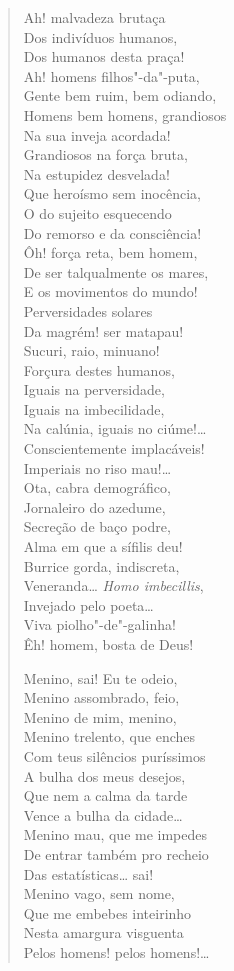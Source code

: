 \begin{verse}
Ah! malvadeza brutaça\\
Dos indivíduos humanos,\\
Dos humanos desta praça!\\
Ah! homens filhos"-da"-puta,\\
Gente bem ruim, bem odiando,\\
Homens bem homens, grandiosos\\
Na sua inveja acordada!\\
Grandiosos na força bruta,\\
Na estupidez desvelada!\\
Que heroísmo sem inocência,\\
O do sujeito esquecendo\\
Do remorso e da consciência!\\
Ôh! força reta, bem homem,\\
De ser talqualmente os mares,\\
E os movimentos do mundo!\\
Perversidades solares\\
Da magrém! ser matapau!\\
Sucuri, raio, minuano!\\
Forçura destes humanos,\\
Iguais na perversidade,\\
Iguais na imbecilidade,\\
Na calúnia, iguais no ciúme!\ldots{}\\
Conscientemente implacáveis!\\
Imperiais no riso mau!\ldots{}\\
Ota, cabra demográfico,\\
Jornaleiro do azedume,\\
Secreção de baço podre,\\
Alma em que a sífilis deu!\\
Burrice gorda, indiscreta,\\
Veneranda\ldots{} \emph{Homo imbecillis},\\
Invejado pelo poeta\ldots{}\\
Viva piolho"-de"-galinha!\\
Êh! homem, bosta de Deus!

Menino, sai! Eu te odeio,\\
Menino assombrado, feio,\\
Menino de mim, menino,\\
Menino trelento, que enches\\
Com teus silêncios puríssimos\\
A bulha dos meus desejos,\\
Que nem a calma da tarde\\
Vence a bulha da cidade\ldots{}\\
Menino mau, que me impedes\\
De entrar também pro recheio\\
Das estatísticas\ldots{} sai!\\
Menino vago, sem nome,\\
Que me embebes inteirinho\\
Nesta amargura visguenta\\
Pelos homens! pelos homens!\ldots{}


\end{verse}

